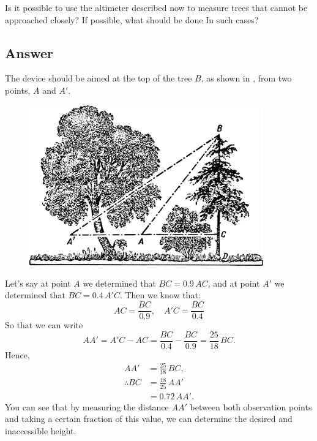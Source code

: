 Is it possible to use the altimeter described now to measure trees that cannot be approached closely? If possible, what should be done In such cases?

\subsection*{Answer}
The device should be aimed at the top of the tree $B$, as shown in , from two points, $A$ and $A'$. 

\begin{figure}[h!]
\centering
\includegraphics[width=0.9\textwidth]{figures/ch-01/fig-01-13.pdf}
\end{figure}

Let's say at point $A$ we determined that $BC = 0.9\,AC$, and at point $A'$ we determined that $BC = 0.4\,A'C$. Then we know that:
\begin{equation*}%
AC = \frac{BC}{0.9},\quad   A'C  = \frac{BC}{0.4} 
\end{equation*}
So that we can write
\begin{equation*}%
AA' = A'C - AC = \frac{BC}{0.4} - \frac{BC}{0.9} = \frac{25}{18} \,BC.
\end{equation*}
Hence,
\begin{align*}%
AA' & = \frac{25}{18} \,BC, \\ 
\therefore BC & = \frac{18}{25} \,AA' \\
& = 0.72 \, AA'.
\end{align*}
You can see that by measuring the distance $AA'$ between both observation points and taking a certain fraction of this value, we can determine the desired and inaccessible height.


